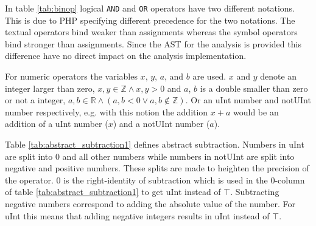 In table \ref{tab:binop} logical \texttt{AND} and \texttt{OR} operators have two different notations. This is due to PHP specifying different precedence for the two notations. The textual operators bind weaker than assignments whereas the symbol operators bind stronger than assignments. Since the AST for the analysis is provided this difference have no direct impact on the analysis implementation.

For numeric operators the variables $x$, $y$, $a$, and $b$ are used. $x$ and $y$ denote an integer larger than zero, $x, y \in \mathbb{Z} \wedge x, y > 0$ and $a$, $b$ is a double smaller than zero or not a integer, $a, b \in \mathbb{R} \wedge (a, b < 0 \vee a, b \notin \mathbb{Z})$. Or an uInt number and notUInt number respectively, e.g. with this notion the addition $x+a$ would be an addition of a uInt number ($x$) and a notUInt number ($a$).


Table \ref{tab:abstract_subtraction1} defines abstract subtraction. Numbers in uInt are split into 0 and all other numbers while numbers in notUInt are split into negative and positive numbers. These splits are made to heighten the precision of the operator. 0 is the right-identity of subtraction which is used in the 0-column of table \ref{tab:abstract_subtraction1} to get uInt instead of $\top$. Subtracting negative numbers correspond to adding the absolute value of the number. For uInt this means that adding negative integers results in uInt instead of $\top$.

